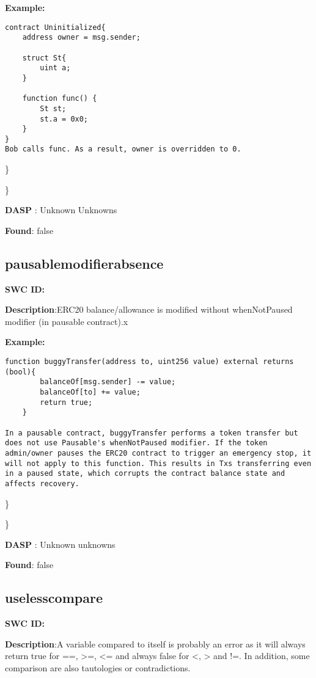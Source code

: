 \documentclass{article}
\begin{document}
\textbf{Example:} 
\begin{verbatim}
contract Uninitialized{
    address owner = msg.sender;

    struct St{
        uint a;
    }

    function func() {
        St st;
        st.a = 0x0;
    }
}
Bob calls func. As a result, owner is overridden to 0.

\end{verbatim}\} 

\} 

\textbf{DASP} : Unknown Unknowns

\textbf{Found}: false

\subsection{pausable\textunderscore modifier\textunderscore absence} 
\textbf{SWC \textunderscore ID:} 

\textbf{Description}:ERC20 balance/allowance is modified without whenNotPaused modifier (in pausable contract).x


\textbf{Example:} 
\begin{verbatim}
function buggyTransfer(address to, uint256 value) external returns (bool){
        balanceOf[msg.sender] -= value;
        balanceOf[to] += value;
        return true;
    }

In a pausable contract, buggyTransfer performs a token transfer but does not use Pausable's whenNotPaused modifier. If the token admin/owner pauses the ERC20 contract to trigger an emergency stop, it will not apply to this function. This results in Txs transferring even in a paused state, which corrupts the contract balance state and affects recovery.

\end{verbatim}\} 

\} 

\textbf{DASP} : Unknown unknowns

\textbf{Found}: false

\subsection{useless\textunderscore compare} 
\textbf{SWC \textunderscore ID:} 

\textbf{Description}:A variable compared to itself is probably an error as it will always return true for ==, >=, <= and always false for <, > and !=. In addition, some comparison are also tautologies or contradictions.
\end{document}

